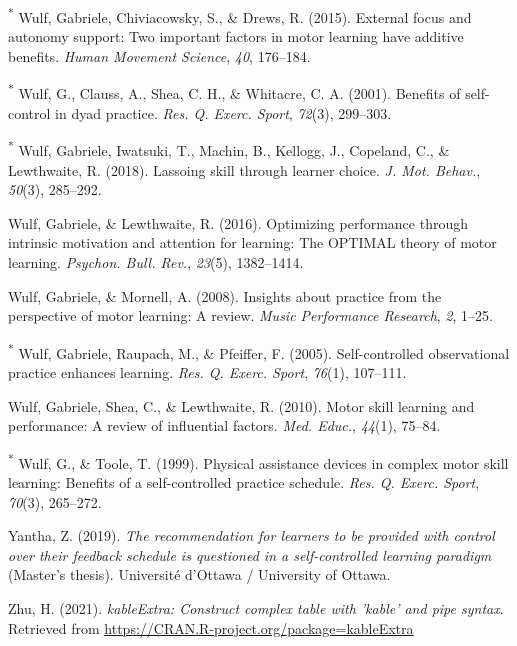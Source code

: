 \documentclass[
  english,
  man, donotrepeattitle,floatsintext]{apa7}
\newlength{\cslhangindent}
\newlength{\cslentryspacingunit} %
\newenvironment{CSLReferences}[2] %
 {%
  \setlength{\parindent}{0pt}
  \ifodd #1
  \let\oldpar\par
  \def\par{\hangindent=\cslhangindent\oldpar}
  \fi
  \setlength{\parskip}{#2\cslentryspacingunit}
 }%
 {}
\begin{document}
\begin{CSLReferences}{1}{0}
\leavevmode{}%
\textsuperscript{*} Wulf, Gabriele, Chiviacowsky, S., \& Drews, R. (2015). External focus and autonomy support: Two important factors in motor learning have additive benefits. \emph{Human Movement Science}, \emph{40}, 176--184.

\leavevmode{}%
\textsuperscript{*} Wulf, G., Clauss, A., Shea, C. H., \& Whitacre, C. A. (2001). Benefits of self-control in dyad practice. \emph{Res. Q. Exerc. Sport}, \emph{72}(3), 299--303.

\leavevmode{}%
\textsuperscript{*} Wulf, Gabriele, Iwatsuki, T., Machin, B., Kellogg, J., Copeland, C., \& Lewthwaite, R. (2018). Lassoing skill through learner choice. \emph{J. Mot. Behav.}, \emph{50}(3), 285--292.

\leavevmode{}%
Wulf, Gabriele, \& Lewthwaite, R. (2016). Optimizing performance through intrinsic motivation and attention for learning: The {OPTIMAL} theory of motor learning. \emph{Psychon. Bull. Rev.}, \emph{23}(5), 1382--1414.

\leavevmode{}%
Wulf, Gabriele, \& Mornell, A. (2008). Insights about practice from the perspective of motor learning: A review. \emph{Music Performance Research}, \emph{2}, 1--25.

\leavevmode{}%
\textsuperscript{*} Wulf, Gabriele, Raupach, M., \& Pfeiffer, F. (2005). Self-controlled observational practice enhances learning. \emph{Res. Q. Exerc. Sport}, \emph{76}(1), 107--111.

\leavevmode{}%
Wulf, Gabriele, Shea, C., \& Lewthwaite, R. (2010). Motor skill learning and performance: A review of influential factors. \emph{Med. Educ.}, \emph{44}(1), 75--84.

\leavevmode{}%
\textsuperscript{*} Wulf, G., \& Toole, T. (1999). Physical assistance devices in complex motor skill learning: Benefits of a self-controlled practice schedule. \emph{Res. Q. Exerc. Sport}, \emph{70}(3), 265--272.

\leavevmode{}%
Yantha, Z. (2019). \emph{The recommendation for learners to be provided with control over their feedback schedule is questioned in a self-controlled learning paradigm} (Master's thesis). Universit{é} d'Ottawa / University of Ottawa.

\leavevmode{}%
Zhu, H. (2021). \emph{kableExtra: Construct complex table with 'kable' and pipe syntax}. Retrieved from \url{https://CRAN.R-project.org/package=kableExtra}

\end{CSLReferences}
\end{document}
